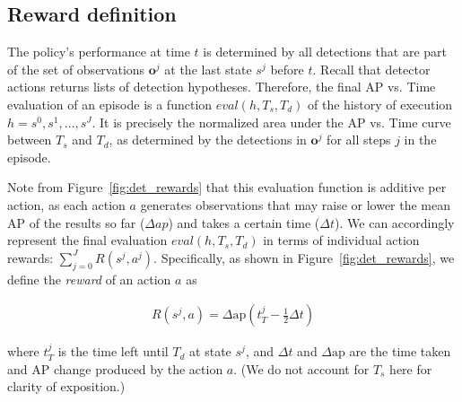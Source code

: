 \subsection{Reward definition}\label{sec:det_reward}

The policy's performance at time $t$ is determined by all detections that are part of the set of observations $\mathbf{o}^j$ at the last state $s^j$ before $t$.
Recall that detector actions returns lists of detection hypotheses.
Therefore, the final AP vs. Time evaluation of an episode is a function $eval(h,T_s,T_d)$ of the history of execution $h=s^0,s^1,\dots,s^J$.
It is precisely the normalized area under the AP vs. Time curve between $T_s$ and $T_d$, as determined by the detections in $\mathbf{o}^j$ for all steps $j$ in the episode.

Note from Figure~\ref{fig:det_rewards} that this evaluation function is additive per action, as each action $a$ generates observations that may raise or lower the mean AP of the results so far ($\Delta ap$) and takes a certain time ($\Delta t$).
We can accordingly represent the final evaluation $eval(h,T_s,T_d)$ in terms of individual action rewards: $\sum_{j=0}^J R(s^j,a^j)$.
Specifically, as shown in Figure~\ref{fig:det_rewards}, we define the \emph{reward} of an action $a$ as

\begin{align}\label{eq:det_reward}
R(s^j,a) = \Delta \text{ap} (t_T^j-\frac{1}{2}\Delta t)
\end{align}

where $t_T^j$ is the time left until $T_d$ at state $s^j$, and $\Delta t$ and $\Delta \text{ap}$ are the time taken and AP change produced by the action $a$.
(We do not account for $T_s$ here for clarity of exposition.)

